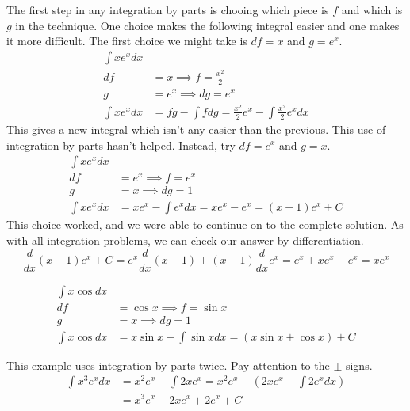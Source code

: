 \documentclass[fleqn]{report}
\begin{document}
\begin{example}
The first step in any integration by parts is chooing 
which piece is $f$ and which is $g$ in the technique.
One choice makes the following integral easier and one makes
it more difficult. The first choice we might take is $df = x$
and $g = e^x$.
\begin{align*}
\int x e^x dx & \\
df & = x \implies f = \frac{x^2}{2} \\
g & = e^x \implies dg = e^x \\
\int x e^x dx & = fg - \int f dg = \frac{x^2}{2} e^x - \int 
\frac{x^2}{2} e^x dx 
\end{align*}
This gives a new integral which isn't any easier than the
previous. This use of integration by parts hasn't helped.
Instead, try $df = e^x$ and $g = x$.
\begin{align*}
\int x e^x dx & \\
df & = e^x \implies f = e^x \\
g & = x \implies dg = 1 \\
\int x e^x dx & = xe^x - \int e^x dx = xe^x - e^x = (x-1)e^x + C
\end{align*}
This choice worked, and we were able to continue on to the
complete solution. As with all integration problems, we can
check our answer by differentiation.
\begin{equation*}
\frac{d}{dx} (x-1)e^x + C = e^x \frac{d}{dx} (x-1) + (x-1)
\frac{d}{dx} e^x = e^x + xe^x - e^x = xe^x
\end{equation*}
\end{example}

\begin{example}
\begin{align*}
\int x \cos dx & \\
df & = \cos x \implies f = \sin x \\
g & = x \implies dg = 1 \\
\int x \cos dx & = x \sin x - \int \sin x dx = (x \sin x +
\cos x) + C
\end{align*}
\end{example}

\begin{example}
This example uses integration by parts twice. Pay
attention to the $\pm$ signs.
\begin{align*}
\int x^3 e^x dx & = x^2 e^x - \int 2x e^x = x^2 e^x - \left( 2xe^x
- \int 2e^x dx \right) \\
& = x^3 e^x - 2xe^x + 2e^x + C
\end{align*}
\end{example}
\end{document}
